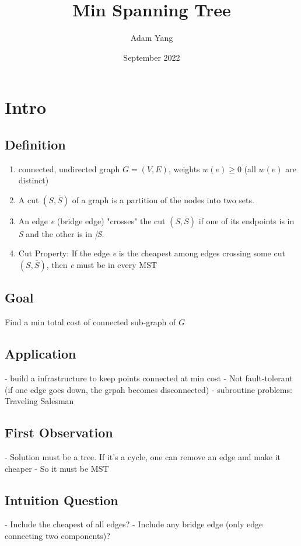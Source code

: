 \documentclass{article}
\title{Min Spanning Tree}
\author{Adam Yang}
\date{September 2022}
\begin{document}
\maketitle

\section{Intro}
\subsection{Definition}
\begin{enumerate}
    \item connected, undirected graph $G=(V,E)$, weights $w(e) \geq 0$ (all $w(e)$ are distinct)
    \item A cut $(S, \bar{S})$ of a graph is a partition of the nodes into two sets.
    
    \item An edge \textit{e} (bridge edge) "crosses" the cut $(S,\bar{S})$ if one of its endpoints is in \textit{S} and the other is in \textit{\bar{S}}.
    
    \item Cut Property: If the edge \textit{e} is the cheapest among edges crossing some cut $(S, \bar{S})$, then \textit{e} must be in every MST
\end{enumerate}



\subsection{Goal}Find a min total cost of connected sub-graph of $G$

\subsection{Application}
- build a infrastructure to keep points connected at min cost
- Not fault-tolerant (if one edge goes down, the grpah becomes disconnected)
- subroutine problems: Traveling Salesman

\subsection{First Observation}
- Solution must be a tree. If it's a cycle, one can remove an edge and make it cheaper
- So it must be MST

\subsection{Intuition Question}
- Include the cheapest of all edges?
- Include any bridge edge (only edge connecting two components)?
\end{document}
